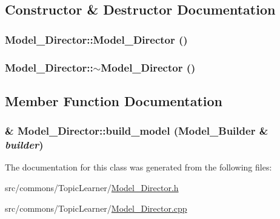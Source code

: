 \subsection{Constructor \& Destructor Documentation}
\hypertarget{class_model___director_a97b0e71e984372fa577d38d65dedebfe}{
\subsubsection[{Model\_\-Director}]{\setlength{\rightskip}{0pt plus 5cm}Model\_\-Director::Model\_\-Director ()}}
\label{class_model___director_a97b0e71e984372fa577d38d65dedebfe}
\hypertarget{class_model___director_a1d83f666e4d4a8072946fe7fd9c2b504}{
\subsubsection[{$\sim$Model\_\-Director}]{\setlength{\rightskip}{0pt plus 5cm}Model\_\-Director::$\sim$Model\_\-Director ()}}
\label{class_model___director_a1d83f666e4d4a8072946fe7fd9c2b504}


\subsection{Member Function Documentation}
\hypertarget{class_model___director_a79c6b243e12ebf4bd8da65b468fbbf08}{
\subsubsection[{build\_\-model}]{ \& Model\_\-Director::build\_\-model ({\bf Model\_\-Builder} \& {\em builder})}}
\label{class_model___director_a79c6b243e12ebf4bd8da65b468fbbf08}


The documentation for this class was generated from the following files:\begin{DoxyCompactItemize}
\item 
src/commons/TopicLearner/\hyperlink{_model___director_8h}{Model\_\-Director.h}\item 
src/commons/TopicLearner/\hyperlink{_model___director_8cpp}{Model\_\-Director.cpp}\end{DoxyCompactItemize}
